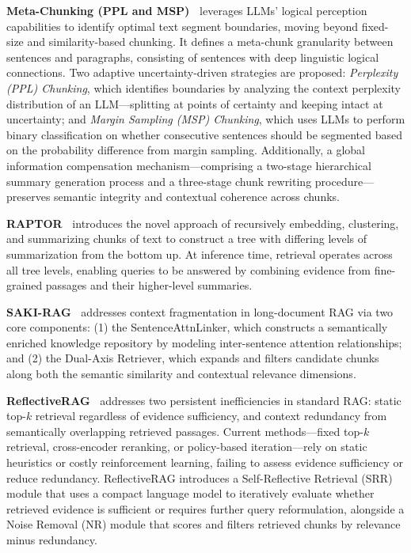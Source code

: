 \noindent
\textbf{Meta-Chunking (PPL and MSP)~\cite{zhao2024meta}} leverages LLMs' logical perception capabilities to identify optimal text segment boundaries, moving beyond fixed-size and similarity-based chunking. It defines a meta-chunk granularity between sentences and paragraphs, consisting of sentences with deep linguistic logical connections.  Two adaptive uncertainty-driven strategies are proposed: \emph{Perplexity (PPL) Chunking}, which identifies boundaries by analyzing the context perplexity distribution of an LLM—splitting at points of certainty and keeping intact at uncertainty; and \emph{Margin Sampling (MSP) Chunking}, which uses LLMs to perform binary classification on whether consecutive sentences should be segmented based on the probability difference from margin sampling. Additionally, a global information compensation mechanism—comprising a two-stage hierarchical summary generation process and a three-stage chunk rewriting procedure—preserves semantic integrity and contextual coherence across chunks.

\noindent
\textbf{RAPTOR~\cite{sarthi2024raptor}} introduces the novel approach of recursively embedding, clustering, and summarizing chunks of text to construct a tree with differing levels of summarization from the bottom up.  At inference time, retrieval operates across all tree levels, enabling queries to be answered by combining evidence from fine-grained passages and their higher-level summaries.

\noindent
\textbf{SAKI-RAG~\cite{tao-etal-2025-saki}} addresses context fragmentation in long-document RAG via two core components: (1) the SentenceAttnLinker, which constructs a semantically enriched knowledge repository by modeling inter-sentence attention relationships; and (2) the Dual-Axis Retriever, which expands and filters candidate chunks along both the semantic similarity and contextual relevance dimensions.

\noindent
\textbf{ReflectiveRAG~\cite{verma-etal-2026-reflectiverag}} addresses two persistent inefficiencies in standard RAG: static top-$k$ retrieval regardless of evidence sufficiency, and context redundancy from semantically overlapping retrieved passages. Current methods—fixed top-$k$ retrieval, cross-encoder reranking, or policy-based iteration—rely on static heuristics or costly reinforcement learning, failing to assess evidence sufficiency or reduce redundancy.  ReflectiveRAG introduces a Self-Reflective Retrieval (SRR) module that uses a compact language model to iteratively evaluate whether retrieved evidence is sufficient or requires further query reformulation, alongside a Noise Removal (NR) module that scores and filters retrieved chunks by relevance minus redundancy.

